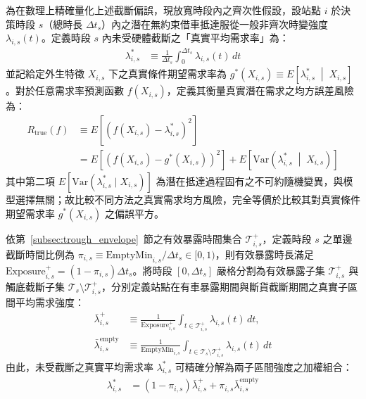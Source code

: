 為在數理上精確量化上述截斷偏誤，現放寬時段內之齊次性假設，設站點 $i$ 於決策時段 $s$（總時長 $\Delta t_s$）內之潛在無約束借車抵達服從一般非齊次時變強度 $\lambda_{i,s}(t)$。定義時段 $s$ 內未受硬體截斷之「真實平均需求率」為：
\begin{align}
\lambda^*_{i,s} &\equiv \frac{1}{\Delta t_s} \int_0^{\Delta t_s} \lambda_{i,s}(t) \, dt
\end{align}
並記給定外生特徵 $X_{i,s}$ 下之真實條件期望需求率為 $g^*(X_{i,s}) \equiv E\left[\lambda^*_{i,s} \;\middle|\; X_{i,s}\right]$。對於任意需求率預測函數 $f(X_{i,s})$，定義其衡量真實潛在需求之均方誤差風險為：
\begin{equation}
\begin{aligned}
R_{\text{true}}(f) &\equiv E\left[ \left( f(X_{i,s}) - \lambda^*_{i,s} \right)^2 \right] \\
&= E\left[ \left( f(X_{i,s}) - g^*(X_{i,s}) \right)^2 \right] + E\left[ \text{Var}\left( \lambda^*_{i,s} \;\middle|\; X_{i,s} \right) \right]
\end{aligned}
\end{equation}
其中第二項 $E\left[\text{Var}(\lambda^*_{i,s} \mid X_{i,s})\right]$ 為潛在抵達過程固有之不可約隨機變異，與模型選擇無關；故比較不同方法之真實需求均方風險，完全等價於比較其對真實條件期望需求率 $g^*(X_{i,s})$ 之偏誤平方。

依第~\ref{subsec:trough_envelope}~節之有效暴露時間集合 $\mathcal{T}^+_{i,s}$，定義時段 $s$ 之單邊截斷時間比例為 $\pi_{i,s} \equiv \text{EmptyMin}_{i,s} / \Delta t_s \in [0, 1)$，則有效暴露時長滿足 $\text{Exposure}^+_{i,s} = (1 - \pi_{i,s})\Delta t_s$。將時段 $[0, \Delta t_s]$ 嚴格分割為有效暴露子集 $\mathcal{T}^+_{i,s}$ 與觸底截斷子集 $\mathcal{T}_s \setminus \mathcal{T}^+_{i,s}$，分別定義站點在有車暴露期間與斷貨截斷期間之真實子區間平均需求強度：
\begin{equation}
\begin{aligned}
\bar{\lambda}^+_{i,s} &\equiv \frac{1}{\text{Exposure}^+_{i,s}} \int_{t \in \mathcal{T}^+_{i,s}} \lambda_{i,s}(t) \, dt, \\
\bar{\lambda}^{\text{empty}}_{i,s} &\equiv \frac{1}{\text{EmptyMin}_{i,s}} \int_{t \in \mathcal{T}_s \setminus \mathcal{T}^+_{i,s}} \lambda_{i,s}(t) \, dt
\end{aligned}
\end{equation}
由此，未受截斷之真實平均需求率 $\lambda^*_{i,s}$ 可精確分解為兩子區間強度之加權組合：
\begin{align}
\lambda^*_{i,s} &= (1 - \pi_{i,s}) \bar{\lambda}^+_{i,s} + \pi_{i,s} \bar{\lambda}^{\text{empty}}_{i,s}
\end{align}

